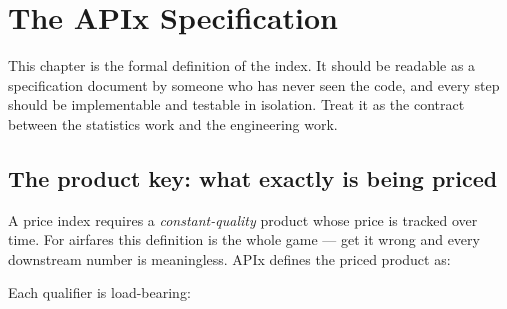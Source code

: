 \chapter{The APIx Specification}

This chapter is the formal definition of the index. It should be readable as a
specification document by someone who has never seen the code, and every step should be
implementable and testable in isolation. Treat it as the contract between the statistics
work and the engineering work.

\section{The product key: what exactly is being priced}
\label{sec:key}

A price index requires a \emph{constant-quality} product whose price is tracked over time.
For airfares this definition is the whole game --- get it wrong and every downstream number
is meaningless. APIx defines the priced product as:

\begin{keybox}
\centering
{}
\end{keybox}

\noindent Each qualifier is load-bearing:

